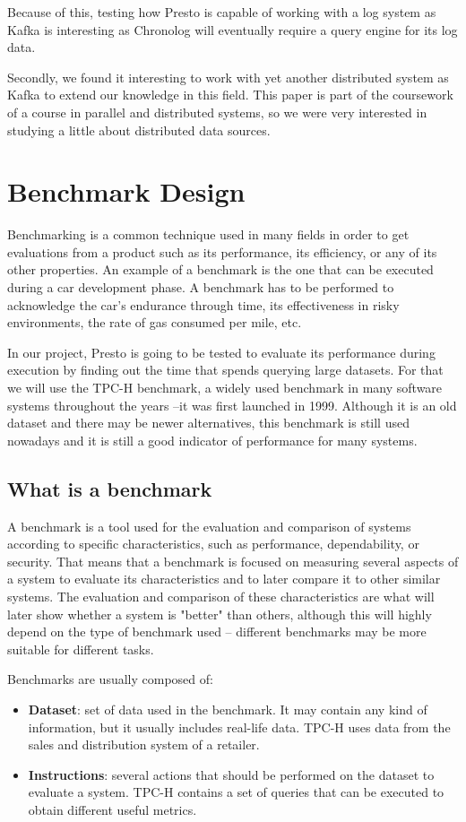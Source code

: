 \documentclass[conference]{IEEEtran}
\begin{document}
Because of this, testing how Presto is capable of working with a log system as Kafka is interesting as Chronolog will eventually require a query engine for its log data.

Secondly, we found it interesting to work with yet another distributed system as Kafka to extend our knowledge in this field. This paper is part of the coursework of a course in parallel and distributed systems, so we were very interested in studying a little about distributed data sources.

\section{Benchmark Design}\label{benchmark}
Benchmarking is a common technique used in many fields in order to get evaluations from a product such as its performance, its efficiency, or any of its other properties. An example of a benchmark is the one that can be executed during a car development phase. A benchmark has to be performed to acknowledge the car's endurance through time, its effectiveness in risky environments, the rate of gas consumed per mile, etc.

In our project, Presto is going to be tested to evaluate its performance during execution by finding out the time that spends querying large datasets. For that we will use the TPC-H benchmark, a widely used benchmark in many software systems throughout the years –it was first launched in 1999. Although it is an old dataset and there may be newer alternatives, this benchmark is still used nowadays and it is still a good indicator of performance for many systems.

\subsection{What is a benchmark}
A benchmark is a tool used for the evaluation and comparison of systems according to specific characteristics, such as performance, dependability, or security. \cite{v-kistowski-2015} That means that a benchmark is focused on measuring several aspects of a system to evaluate its characteristics and to later compare it to other similar systems. The evaluation and comparison of these characteristics are what will later show whether a system is "better" than others, although this will highly depend on the type of benchmark used – different benchmarks may be more suitable for different tasks.

Benchmarks are usually composed of:
\begin{itemize}
    \item \textbf{Dataset}: set of data used in the benchmark. It may contain any kind of information, but it usually includes real-life data. TPC-H uses data from the sales and distribution system of a retailer.
    \item \textbf{Instructions}: several actions that should be performed on the dataset to evaluate a system. TPC-H contains a set of queries that can be executed to obtain different useful metrics.
\end{itemize}
\end{document}
